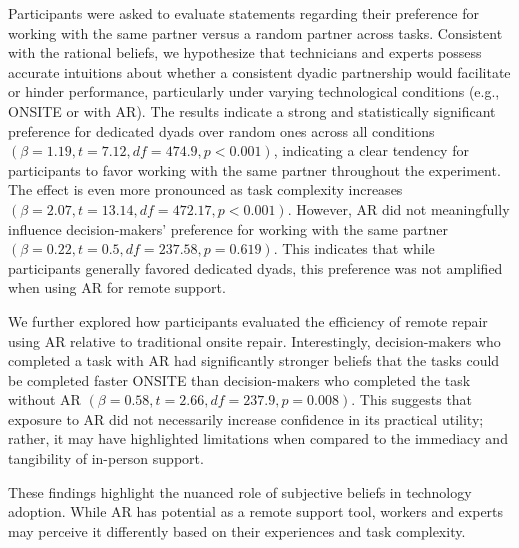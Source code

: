 \documentclass[msom,nonblindrev]{01 latex/class/informs3}
\begin{document}
Participants were asked to evaluate statements regarding their preference for working with the same partner versus a random partner across tasks. Consistent with the rational beliefs, we hypothesize that technicians and experts possess accurate intuitions about whether a consistent dyadic partnership would facilitate or hinder performance, particularly under varying technological conditions (e.g., ONSITE or with AR). The results indicate a strong and statistically significant preference for dedicated dyads over random ones across all conditions $(\beta = 1.19, t=7.12, df=474.9, p<0.001)$, indicating a clear tendency for participants to favor working with the same partner throughout the experiment. The effect is even more pronounced as task complexity increases $(\beta = 2.07, t=13.14, df=472.17, p<0.001)$. However, AR did not meaningfully influence decision-makers’ preference for working with the same partner $(\beta = 0.22, t=0.5, df=237.58, p=0.619)$. This indicates that while participants generally favored dedicated dyads, this preference was not amplified when using AR for remote support.

We further explored how participants evaluated the efficiency of remote repair using AR relative to traditional onsite repair. Interestingly, decision-makers who completed a task with AR had significantly stronger beliefs that the tasks could be completed faster ONSITE than decision-makers who completed the task without AR $(\beta = 0.58, t=2.66, df=237.9, p=0.008)$. This suggests that exposure to AR did not necessarily increase confidence in its practical utility; rather, it may have highlighted limitations when compared to the immediacy and tangibility of in-person support. 


These findings highlight the nuanced role of subjective beliefs in technology adoption. While AR has potential as a remote support tool, workers and experts may perceive it differently based on their experiences and task complexity.

\newpage


\newpage
\end{document}
